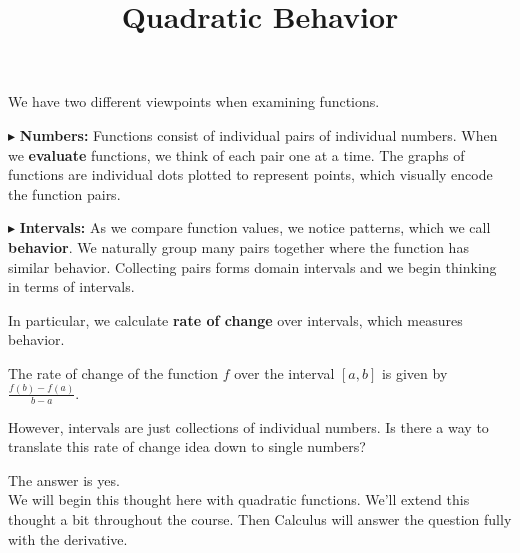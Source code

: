 \documentclass{ximera}
\title{Quadratic  Behavior}
\begin{document}
\begin{abstract}
\end{abstract}
\maketitle







We have two different viewpoints when examining functions.


$\blacktriangleright$ \textbf{Numbers:}  Functions consist of individual pairs of individual numbers.  When we \textbf{\textcolor{purple!85!blue}{evaluate}} functions, we think of each pair one at a time.  The graphs of functions are individual dots plotted to represent points, which visually encode the function pairs. 







$\blacktriangleright$ \textbf{Intervals:} As we compare function values, we notice patterns, which we call \textbf{\textcolor{purple!85!blue}{behavior}}. We naturally group many pairs together where the function has similar behavior.  Collecting pairs forms domain intervals and we begin thinking in terms of intervals.





In particular, we calculate \textbf{\textcolor{blue!55!black}{rate of change}} over intervals, which measures behavior. 



The rate of change of the function $f$ over the interval $[a, b]$ is given by $\frac{f(b) - f(a)}{b - a}$.




However, intervals are just collections of individual numbers.  Is there a way to translate this rate of change idea down to single numbers?

The answer is yes.  \\


We will begin this thought here with quadratic functions. We'll extend this thought a bit throughout the course. Then Calculus will answer the question fully with the derivative.
\end{document}
